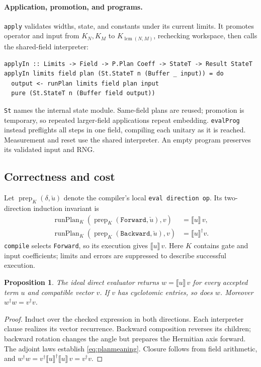 \documentclass[11pt,a4paper]{article}
\newcommand{\sem}[1]{\llbracket #1\rrbracket}
\newcommand{\code}[1]{\texttt{#1}}
\DeclareMathOperator{\lcm}{lcm}
\newtheorem{proposition}{Proposition}
\begin{document}
\paragraph{Application, promotion, and programs.}
\code{apply} validates widths, state, and constants under its current limits.
It promotes operator and input from $K_N,K_M$ to $K_{\lcm(N,M)}$, rechecking
workspace, then calls the shared-field interpreter:
\begin{lstlisting}[label=lst:plan-apply]
applyIn :: Limits -> Field -> P.Plan Coeff -> StateT -> Result StateT
applyIn limits field plan (St.StateT n (Buffer _ input)) = do
  output <- runPlan limits field plan input
  pure (St.StateT n (Buffer field output))
\end{lstlisting}
\code{St} names the internal state module. Same-field plans are reused;
promotion is temporary, so repeated larger-field applications repeat embedding.
\code{evalProg} instead preflights all steps in one field, compiling each
unitary as it is reached. Measurement and reset use the shared interpreter.
An empty program preserves its validated input and RNG.

\subsection{Correctness and cost}
Let $\operatorname{prep}_K(\delta,\check u)$ denote the compiler's local
\code{eval direction op}. Its two-direction induction invariant is
\begin{equation}
\begin{aligned}
\operatorname{runPlan}_K(\operatorname{prep}_K(\code{Forward},\check u),v)
 &=\sem u\,v,\\
\operatorname{runPlan}_K(\operatorname{prep}_K(\code{Backward},\check u),v)
 &=\sem u^\dagger v.
\end{aligned}
\label{eq:planmeaning}
\end{equation}
\code{compile} selects \code{Forward}, so its execution gives $\sem u\,v$.
Here $K$ contains gate and input coefficients; limits and errors are
suppressed to describe successful execution.
\begin{proposition}
The ideal direct evaluator returns $w=\sem u\,v$ for every accepted term $u$
and compatible vector $v$. If $v$ has cyclotomic entries, so does $w$.
Moreover $w^\dagger w=v^\dagger v$.
\end{proposition}
\begin{proof}
Induct over the checked expression in both directions. Each interpreter
clause realizes its vector recurrence. Backward composition reverses its
children; backward rotation changes the angle but prepares the Hermitian
axis forward. The adjoint laws establish \eqref{eq:planmeaning}.
Closure follows from field arithmetic,
and $w^\dagger w=v^\dagger\sem u^\dagger\sem u\,v=v^\dagger v$.
\end{proof}
\end{document}
